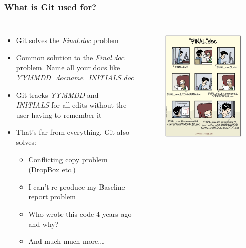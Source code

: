 \documentclass[aspectratio=169]{beamer} %
\begin{document}
\begin{frame}
\frametitle{What is Git used for?}

	\begin{columns}[c]

		\begin{itemize}
			\item Git solves the \textit{Final.doc} problem
			\item <2->Common solution to the \textit{Final.doc} problem. Name all your docs like \textit{YYMMDD\_docname\_INITIALS.doc}
			\item <3->Git tracks \textit{YYMMDD} and \textit{INITIALS} for all edits  without the user having to remember it
			\item <4->That's far from everything, Git also solves:
			\begin{itemize}
				\item <4->Conflicting copy problem (DropBox etc.)
				\item <4->I can't re-produce my Baseline report problem
				\item <4->Who wrote this code 4 years ago and why?
				\item <4->And much much more...
			\end{itemize}
		\end{itemize}

		\begin{figure}
			\centering
			\includegraphics[width=1\linewidth]{../../Common-Resources/img/finaldoc_cartoon}
			\label{fig:finaldoccartoon}
		\end{figure}


\end{columns}
\end{frame}
\end{document}
